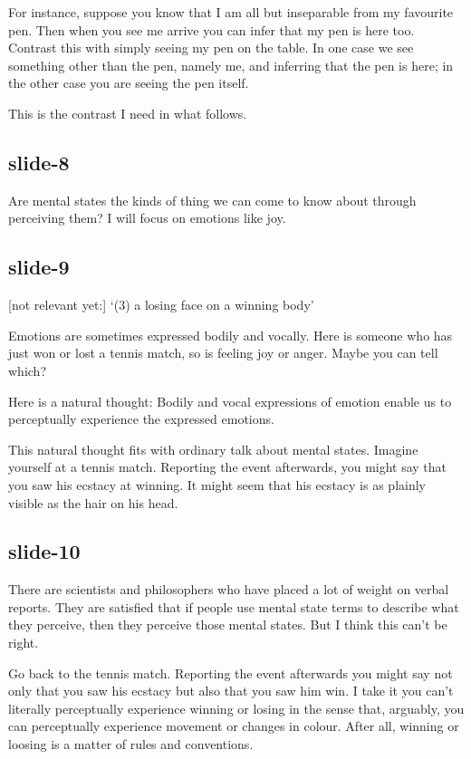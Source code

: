 \documentclass[12pt,\papersize]{extarticle}
\begin{document}
For instance, suppose you know that I am all but inseparable from my favourite pen.
Then when you see me arrive you can infer that my pen is here too.
Contrast this with simply seeing my pen on the table.
In one case we see something other than the pen, namely me, and inferring that the
pen is here; in the other case you are seeing the pen itself.

This is the contrast I need in what follows.

\subsection{slide-8}
Are mental states the kinds of thing we can come to know about through
perceiving them?
I will focus on emotions like joy.

\subsection{slide-9}
[not relevant yet:] ‘(3) a losing face on a winning body’

Emotions are sometimes expressed bodily and vocally.
Here is someone who has just won or lost a tennis match, so is feeling
joy or anger.  Maybe you can tell which?

Here is a natural thought:
Bodily and vocal expressions of emotion
enable us to perceptually experience the expressed emotions.

This natural thought fits with ordinary talk about mental states.
Imagine yourself at a tennis match.
Reporting the event afterwards, you might say that you saw his ecstacy
at winning.
It might seem that his ecstacy is as plainly visible as the hair on his head.

\subsection{slide-10}
There are scientists and philosophers who have placed a lot of weight
on verbal reports.
They are satisfied that if people use mental state terms to describe what they
perceive, then they perceive those mental states.
But I think this can’t be right.

Go back to the tennis match.
Reporting the event afterwards you might say not only that you saw his ecstacy
but also that you saw him win.
I take it you can't literally perceptually experience winning or losing
in the sense that, arguably, you can perceptually experience movement or changes in colour.
After all, winning or loosing is a matter of rules and conventions.
\end{document}
